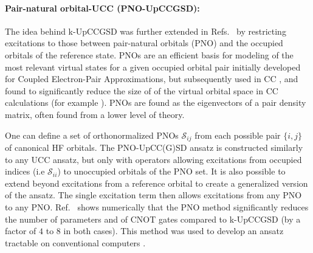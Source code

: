 \paragraph{Pair-natural orbital-UCC (PNO-UpCCGSD):}The idea behind k-UpCCGSD was further extended in Refs.~\cite{Kottmann2021_1, Kottmann2021_2} by restricting excitations to those between pair-natural orbitals (PNO) and the occupied orbitals of the reference state. PNOs are an efficient basis for modeling of the most relevant virtual states for a given occupied orbital pair \cite{Edmiston1968, Ahlrichs1975, Meyer1973, Meyer2009} initially developed for Coupled Electron-Pair Approximations, but subsequently used in CC \cite{Neese2009_1, Neese2009_2}, and found to significantly reduce the size of of the virtual orbital space in CC calculations (for example \cite{Nagy2019}). PNOs are found as the eigenvectors of a pair density matrix, often found from a lower level of theory.

One can define a set of orthonormalized PNOs $\mathcal{S}_{ij}$ from each possible pair $\{i, j\}$ of canonical HF orbitals. The PNO-UpCC(G)SD ansatz is constructed similarly to any UCC ansatz, but only with operators allowing excitations from occupied indices (i.e  $\mathcal{S}_{ii}$) to unoccupied orbitals of the PNO set. It is also possible to extend beyond excitations from a reference orbital to create a generalized version of the ansatz. The single excitation term then allows excitations from any PNO to any PNO. Ref.~\cite{Kottmann2021_1} shows numerically that the PNO method significantly reduces the number of parameters and of CNOT gates compared to k-UpCCGSD (by a factor of $4$ to $8$ in both cases). This method was used to develop an ansatz tractable on conventional computers \cite{Kottmann2021_2}.

